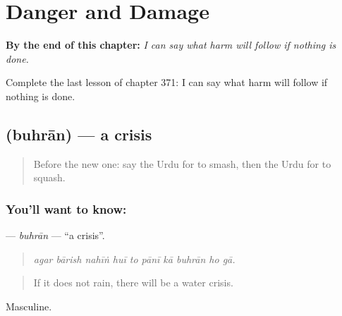 
\chapter{Danger and Damage}
\label{ch:ur-danger-and-damage}

\begin{chapteropening}
\textbf{By the end of this chapter:} \emph{I can say what harm will follow if nothing is done.}

Complete the last lesson of chapter 371: I can say what harm will follow if nothing is done.
\end{chapteropening}

\section[\texorpdfstring{\ur{بحران} (buhrān)}{بحران (buhrān)}]{ (buhrān) — a crisis}

\label{lesson:UR-C371-buhran}



\begin{quote}
Before the new one: say the Urdu for to smash, then the Urdu for to squash.
\end{quote}

\subsection*{You'll want to know: }
\textbf{} — \emph{buhrān} — \textquotedblleft{}a crisis\textquotedblright{}.

\begin{quote}
         
\end{quote}

\begin{quote}
\emph{agar bārish nahīṅ huī to pānī kā buhrān ho gā.}
\end{quote}

\begin{quote}
If it does not rain, there will be a water crisis.
\end{quote}

Masculine.

